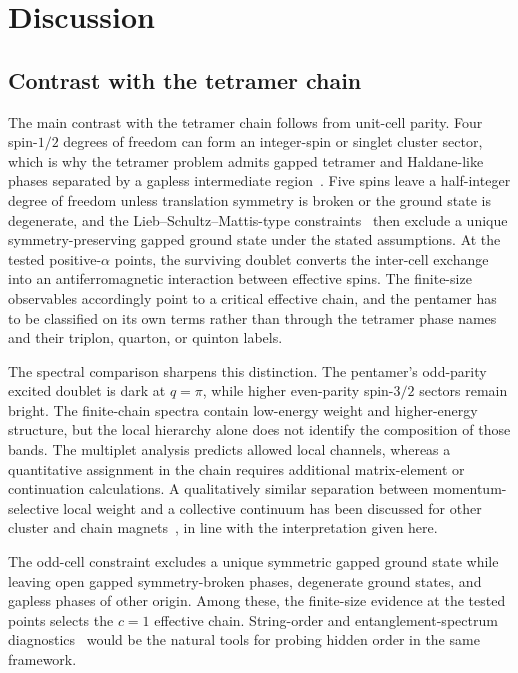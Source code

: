 \section{Discussion}
\label{sec:discussion}

\subsection{Contrast with the tetramer chain}

The main contrast with the tetramer chain follows from unit-cell parity.
Four spin-$1/2$ degrees of freedom can form an integer-spin or singlet cluster
sector, which is why the tetramer problem admits gapped tetramer and Haldane-like
phases separated by a gapless intermediate
region~\cite{li2026tetramer,gong2008tetramer}.
Five spins leave a half-integer degree of freedom unless translation symmetry is
broken or the ground state is degenerate, and the Lieb--Schultz--Mattis-type
constraints~\cite{lieb1961,ogata2019,affleck1987} then exclude a unique
symmetry-preserving gapped ground state under the stated assumptions.
At the tested positive-$\alpha$ points, the surviving doublet converts the
inter-cell exchange into an antiferromagnetic interaction between effective spins.
The finite-size observables accordingly point to a critical effective chain, and
the pentamer has to be classified on its own terms rather than through the
tetramer phase names and their triplon, quarton, or quinton labels.

The spectral comparison sharpens this distinction.
The pentamer's odd-parity excited doublet is dark at $q=\pi$, while higher
even-parity spin-$3/2$ sectors remain bright.
The finite-chain spectra contain low-energy weight and higher-energy structure,
but the local hierarchy alone does not identify the composition of those bands.
The multiplet analysis predicts allowed local channels, whereas a quantitative
assignment in the chain requires additional matrix-element or continuation
calculations.
A qualitatively similar separation between momentum-selective local weight and a
collective continuum has been discussed for other cluster and chain
magnets~\cite{keselman2020,gao2024srv3o9,bruognolo2016}, in line with the
interpretation given here.

The odd-cell constraint excludes a unique symmetric gapped ground state while
leaving open gapped symmetry-broken phases, degenerate ground states, and gapless
phases of other origin.
Among these, the finite-size evidence at the tested points selects the $c=1$
effective chain.
String-order and entanglement-spectrum
diagnostics~\cite{guwen2009,pollmann2010,pollmann2012,han2017bcfg} would be the
natural tools for probing hidden order in the same framework.

